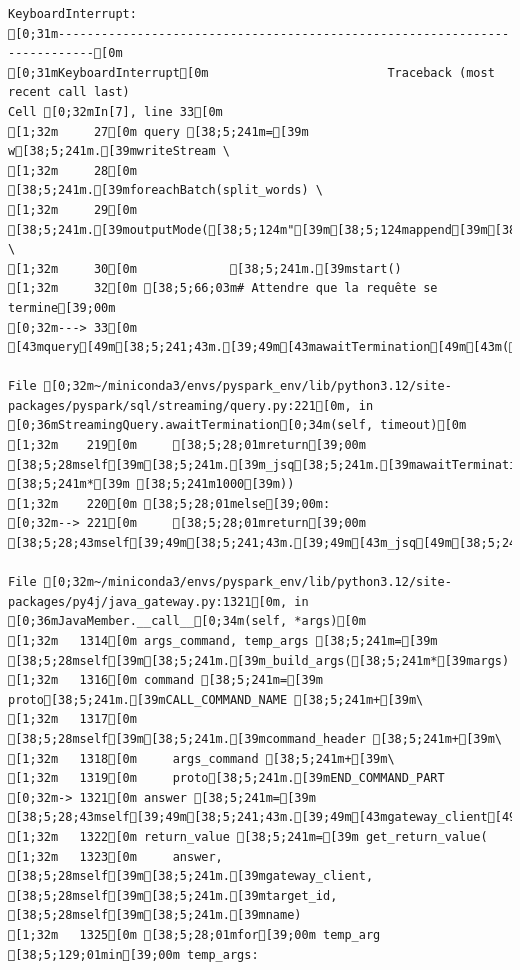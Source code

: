 \documentclass[
  letterpaper,
  DIV=11,
  numbers=noendperiod]{scrartcl}
\begin{document}
\begin{verbatim}
KeyboardInterrupt: 
[0;31m---------------------------------------------------------------------------[0m
[0;31mKeyboardInterrupt[0m                         Traceback (most recent call last)
Cell [0;32mIn[7], line 33[0m
[1;32m     27[0m query [38;5;241m=[39m w[38;5;241m.[39mwriteStream \
[1;32m     28[0m             [38;5;241m.[39mforeachBatch(split_words) \
[1;32m     29[0m             [38;5;241m.[39moutputMode([38;5;124m"[39m[38;5;124mappend[39m[38;5;124m"[39m) \
[1;32m     30[0m             [38;5;241m.[39mstart()
[1;32m     32[0m [38;5;66;03m# Attendre que la requête se termine[39;00m
[0;32m---> 33[0m [43mquery[49m[38;5;241;43m.[39;49m[43mawaitTermination[49m[43m([49m[43m)[49m

File [0;32m~/miniconda3/envs/pyspark_env/lib/python3.12/site-packages/pyspark/sql/streaming/query.py:221[0m, in [0;36mStreamingQuery.awaitTermination[0;34m(self, timeout)[0m
[1;32m    219[0m     [38;5;28;01mreturn[39;00m [38;5;28mself[39m[38;5;241m.[39m_jsq[38;5;241m.[39mawaitTermination([38;5;28mint[39m(timeout [38;5;241m*[39m [38;5;241m1000[39m))
[1;32m    220[0m [38;5;28;01melse[39;00m:
[0;32m--> 221[0m     [38;5;28;01mreturn[39;00m [38;5;28;43mself[39;49m[38;5;241;43m.[39;49m[43m_jsq[49m[38;5;241;43m.[39;49m[43mawaitTermination[49m[43m([49m[43m)[49m

File [0;32m~/miniconda3/envs/pyspark_env/lib/python3.12/site-packages/py4j/java_gateway.py:1321[0m, in [0;36mJavaMember.__call__[0;34m(self, *args)[0m
[1;32m   1314[0m args_command, temp_args [38;5;241m=[39m [38;5;28mself[39m[38;5;241m.[39m_build_args([38;5;241m*[39margs)
[1;32m   1316[0m command [38;5;241m=[39m proto[38;5;241m.[39mCALL_COMMAND_NAME [38;5;241m+[39m\
[1;32m   1317[0m     [38;5;28mself[39m[38;5;241m.[39mcommand_header [38;5;241m+[39m\
[1;32m   1318[0m     args_command [38;5;241m+[39m\
[1;32m   1319[0m     proto[38;5;241m.[39mEND_COMMAND_PART
[0;32m-> 1321[0m answer [38;5;241m=[39m [38;5;28;43mself[39;49m[38;5;241;43m.[39;49m[43mgateway_client[49m[38;5;241;43m.[39;49m[43msend_command[49m[43m([49m[43mcommand[49m[43m)[49m
[1;32m   1322[0m return_value [38;5;241m=[39m get_return_value(
[1;32m   1323[0m     answer, [38;5;28mself[39m[38;5;241m.[39mgateway_client, [38;5;28mself[39m[38;5;241m.[39mtarget_id, [38;5;28mself[39m[38;5;241m.[39mname)
[1;32m   1325[0m [38;5;28;01mfor[39;00m temp_arg [38;5;129;01min[39;00m temp_args:


\end{verbatim}
\end{document}
